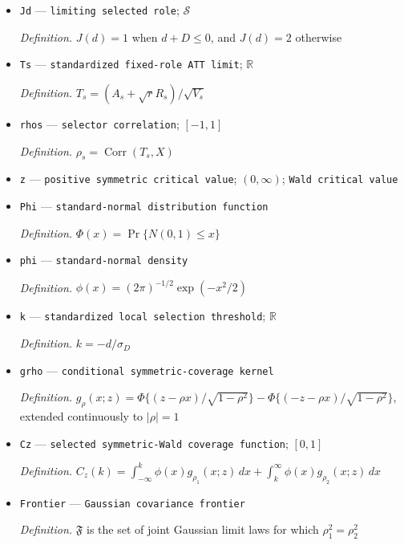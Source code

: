 \documentclass{article}
\begin{document}
\begin{itemize}
  \par\smallskip\noindent\emph{Definition.} \(X=D/\sigma_D\)
  \item \texttt{Jd} --- \texttt{limiting selected role}; \(\mathcal S\)
  \par\smallskip\noindent\emph{Definition.} \(J(d)=1\) when \(d+D\leq0\), and \(J(d)=2\) otherwise
  \item \texttt{Ts} --- \texttt{standardized fixed-\allowbreak{}role ATT limit}; \(\mathbb R\)
  \par\smallskip\noindent\emph{Definition.} \(T_s=(A_s+\sqrt rR_s)/\sqrt{V_s}\)
  \item \texttt{rhos} --- \texttt{selector correlation}; \([-1,1]\)
  \par\smallskip\noindent\emph{Definition.} \(\rho_s=\operatorname{Corr}(T_s,X)\)
  \item \texttt{z} --- \texttt{positive symmetric critical value}; \((0,\infty)\); \texttt{Wald critical value}
  \item \texttt{Phi} --- \texttt{standard-\allowbreak{}normal distribution function}
  \par\smallskip\noindent\emph{Definition.} \(\Phi(x)=\Pr\{N(0,1)\leq x\}\)
  \item \texttt{phi} --- \texttt{standard-\allowbreak{}normal density}
  \par\smallskip\noindent\emph{Definition.} \(\phi(x)=(2\pi)^{-1/2}\exp(-x^2/2)\)
  \item \texttt{k} --- \texttt{standardized local selection threshold}; \(\mathbb R\)
  \par\smallskip\noindent\emph{Definition.} \(k=-d/\sigma_D\)
  \item \texttt{grho} --- \texttt{conditional symmetric-\allowbreak{}coverage kernel}
  \par\smallskip\noindent\emph{Definition.} \(g_{\rho}(x;z)=\Phi\{(z-\rho x)/\sqrt{1-\rho^2}\}-\Phi\{(-z-\rho x)/\sqrt{1-\rho^2}\}\), extended continuously to \(|\rho|=1\)
  \item \texttt{Cz} --- \texttt{selected symmetric-\allowbreak{}Wald coverage function}; \([0,1]\)
  \par\smallskip\noindent\emph{Definition.} \(C_z(k)=\int_{-\infty}^{k}\phi(x)g_{\rho_1}(x;z)\,dx+\int_k^{\infty}\phi(x)g_{\rho_2}(x;z)\,dx\)
  \item \texttt{Frontier} --- \texttt{Gaussian covariance frontier}
  \par\smallskip\noindent\emph{Definition.} \(\mathfrak F\) is the set of joint Gaussian limit laws for which \(\rho_1^2=\rho_2^2\)

\end{itemize}
\end{document}
